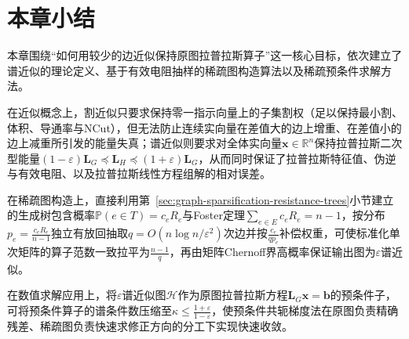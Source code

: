 \section{本章小结}
\label{sec:graph-sparsification-summary}

本章围绕“如何用较少的边近似保持原图拉普拉斯算子”这一核心目标，依次建立了谱近似的理论定义、基于有效电阻抽样的稀疏图构造算法以及稀疏预条件求解方法。

在近似概念上，割近似只要求保持零一指示向量上的子集割权（足以保持最小割、体积、导通率与NCut），但无法防止连续实向量在差值大的边上增重、在差值小的边上减重所引发的能量失真；谱近似则要求对全体实向量$\bm x\in\mathbb R^n$保持拉普拉斯二次型能量$(1-\varepsilon)\bm L_G\preceq\bm L_H\preceq(1+\varepsilon)\bm L_G$，从而同时保证了拉普拉斯特征值、伪逆与有效电阻、以及拉普拉斯线性方程组解的相对误差。

在稀疏图构造上，直接利用第~\ref{sec:graph-sparsification-resistance-trees}小节建立的生成树包含概率$\mathbb P(e\in T)=c_e R_e$与Foster定理$\sum_{e\in E}c_e R_e=n-1$，按分布$p_e=\frac{c_e R_e}{n-1}$独立有放回抽取$q=O(n\log n/\varepsilon^2)$次边并按$\frac{c_e}{qp_e}$补偿权重，可使标准化单次矩阵的算子范数一致拉平为$\frac{n-1}{q}$，再由矩阵Chernoff界高概率保证输出图为$\varepsilon$谱近似。

在数值求解应用上，将$\varepsilon$谱近似图$\mathcal H$作为原图拉普拉斯方程$\bm L_G\bm x=\bm b$的预条件子，可将预条件算子的谱条件数压缩至$\kappa\leq\frac{1+\varepsilon}{1-\varepsilon}$，使预条件共轭梯度法在原图负责精确残差、稀疏图负责快速求修正方向的分工下实现快速收敛。
